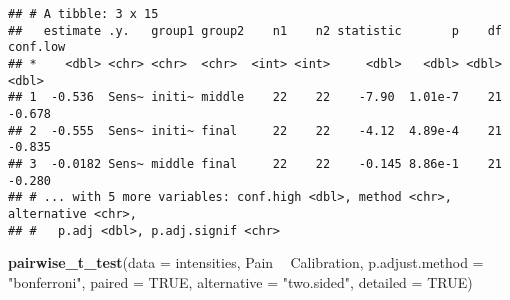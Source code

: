 \documentclass[
]{article}
\newenvironment{Shaded}{\begin{snugshade}}{\end{snugshade}}
\newcommand{\CommentTok}[1]{\textcolor[rgb]{0.56,0.35,0.01}{\textit{#1}}}
\newcommand{\DataTypeTok}[1]{\textcolor[rgb]{0.13,0.29,0.53}{#1}}
\newcommand{\DecValTok}[1]{\textcolor[rgb]{0.00,0.00,0.81}{#1}}
\newcommand{\KeywordTok}[1]{\textcolor[rgb]{0.13,0.29,0.53}{\textbf{#1}}}
\newcommand{\NormalTok}[1]{#1}
\newcommand{\OperatorTok}[1]{\textcolor[rgb]{0.81,0.36,0.00}{\textbf{#1}}}
\newcommand{\OtherTok}[1]{\textcolor[rgb]{0.56,0.35,0.01}{#1}}
\newcommand{\StringTok}[1]{\textcolor[rgb]{0.31,0.60,0.02}{#1}}
\begin{document}
\begin{Shaded}
\end{Shaded}

\begin{verbatim}
## # A tibble: 3 x 15
##   estimate .y.   group1 group2    n1    n2 statistic       p    df conf.low
## *    <dbl> <chr> <chr>  <chr>  <int> <int>     <dbl>   <dbl> <dbl>    <dbl>
## 1  -0.536  Sens~ initi~ middle    22    22    -7.90  1.01e-7    21   -0.678
## 2  -0.555  Sens~ initi~ final     22    22    -4.12  4.89e-4    21   -0.835
## 3  -0.0182 Sens~ middle final     22    22    -0.145 8.86e-1    21   -0.280
## # ... with 5 more variables: conf.high <dbl>, method <chr>, alternative <chr>,
## #   p.adj <dbl>, p.adj.signif <chr>
\end{verbatim}

\begin{Shaded}
\begin{Highlighting}[]
\KeywordTok{pairwise_t_test}\NormalTok{(}\DataTypeTok{data =}\NormalTok{ intensities, Pain }\OperatorTok{~}\StringTok{ }\NormalTok{Calibration, }\DataTypeTok{p.adjust.method =} \StringTok{"bonferroni"}\NormalTok{, }\DataTypeTok{paired =} \OtherTok{TRUE}\NormalTok{, }\DataTypeTok{alternative =} \StringTok{"two.sided"}\NormalTok{, }\DataTypeTok{detailed =} \OtherTok{TRUE}\NormalTok{)}
\end{Highlighting}
\end{Shaded}
\end{document}
